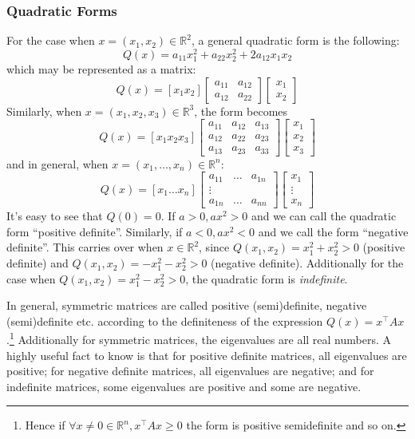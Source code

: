 \documentclass[11pt,]{article}
\let\rmarkdownfootnote\footnote%
\def\footnote{\protect\rmarkdownfootnote}
\begin{document}
\subsubsection{Quadratic Forms}\label{quadratic-forms}

For the case when \(x = (x_1, x_2) \in \mathbb{R}^2\), a general
quadratic form is the following: \[
Q(x) = a_{11}x_1^2 + a_{22}x_2^2 + 2a_{12}x_1x_2
\] which may be represented as a matrix: \[
Q(x) = [x_1 x_2]\begin{bmatrix}a_{11} & a_{12}\\ a_{12} & a_{22}\end{bmatrix}
\begin{bmatrix}x_1 \\ x_2\end{bmatrix}
\] Similarly, when \(x = (x_1, x_2, x_3) \in \mathbb{R}^3\), the form
becomes \[
Q(x) = [x_1 x_2 x_3]\begin{bmatrix}a_{11} & a_{12} & a_{13}\\ a_{12} & a_{22} & a_{23}\\
a_{13} & a_{23} & a_{33}\end{bmatrix} \begin{bmatrix}x_1 \\ x_2 \\ x_3\end{bmatrix}
\] and in general, when \(x = (x_1, \hdots, x_n) \in \mathbb{R}^n\): \[
Q(x) = [x_1 \hdots x_n]\begin{bmatrix}a_{11} & \hdots & a_{1n}\\ \vdots\\
a_{1n} & \hdots & a_{nn}\end{bmatrix} \begin{bmatrix}x_1\\ \vdots\\ x_n\end{bmatrix}
\] It's easy to see that \(Q(0) = 0\). If \(a>0, ax^2>0\) and we can
call the quadratic form ``positive definite''. Similarly, if
\(a<0, ax^2<0\) and we call the form ``negative definite''. This carries
over when \(x\in \mathbb{R}^2\), since \(Q(x_1, x_2) = x_1^2+x_2^2>0\)
(positive definite) and \(Q(x_1, x_2) = -x_1^2-x_2^2>0\) (negative
definite). Additionally for the case when
\(Q(x_1, x_2) = x_1^2-x_2^2>0\), the quadratic form is
\emph{indefinite}.

In general, symmetric matrices are called positive (semi)definite,
negative (semi)definite etc. according to the definiteness of the
expression \(Q(x) = x^{\top}Ax\).\footnote{Hence if
  \(\forall x\neq0\in \mathbb{R}^n, x^{\top}Ax\geq 0\) the form is
  positive semidefinite and so on.} Additionally for symmetric matrices,
the eigenvalues are all real numbers. A highly useful fact to know is
that for positive definite matrices, all eigenvalues are positive; for
negative definite matrices, all eigenvalues are negative; and for
indefinite matrices, some eigenvalues are positive and some are
negative.
\end{document}

